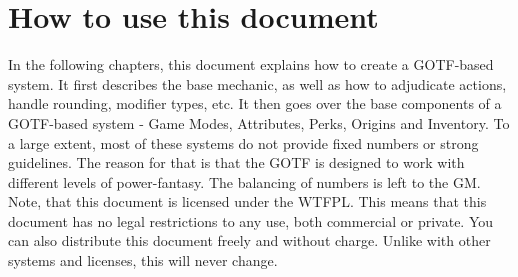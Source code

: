 \section{How to use this document}\label{sec:howtouse}
In the following chapters, this document explains how to create a GOTF-based system.
It first describes the base mechanic, as well as how to adjudicate actions, handle rounding, modifier types, etc.
It then goes over the base components of a GOTF-based system - Game Modes, Attributes, Perks, Origins and Inventory.
To a large extent, most of these systems do not provide fixed numbers or strong guidelines.
The reason for that is that the GOTF is designed to work with different levels of power-fantasy.
The balancing of numbers is left to the GM.
Note, that this document is licensed under the WTFPL.
This means that this document has no legal restrictions to any use, both commercial or private.
You can also distribute this document freely and without charge.
Unlike with other systems and licenses, this will never change.
